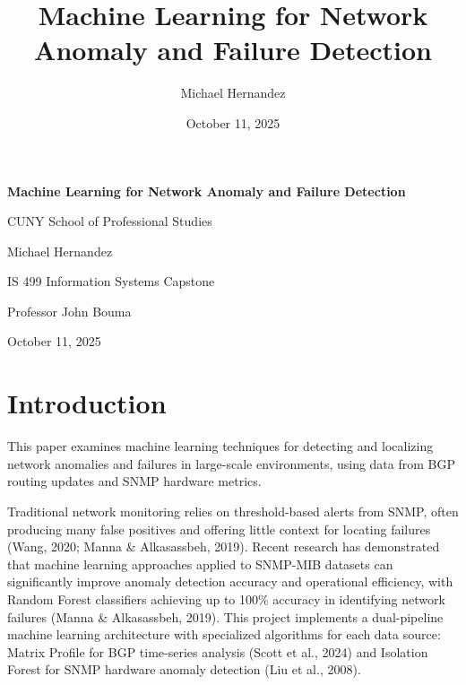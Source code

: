 \documentclass[11pt]{article}
\title{Machine Learning for Network Anomaly and Failure Detection}
\author{Michael Hernandez}
\date{October 11, 2025}
\begin{document}
\begin{titlepage}
\centering
\vspace*{2cm}

{\Large \textbf{Machine Learning for Network Anomaly and Failure Detection}}

\vspace{1.5cm}

{\large CUNY School of Professional Studies}

\vspace{0.5cm}

{\large Michael Hernandez}

\vspace{0.5cm}

{\large IS 499 Information Systems Capstone}

\vspace{0.5cm}

{\large Professor John Bouma}

\vspace{0.5cm}

{\large October 11, 2025}

\vfill

\end{titlepage}

\tableofcontents
\newpage

\section{Introduction}

This paper examines machine learning techniques for detecting and localizing network anomalies and failures in large-scale environments, using data from BGP routing updates and SNMP hardware metrics.

Traditional network monitoring relies on threshold-based alerts from SNMP, often producing many false positives and offering little context for locating failures (Wang, 2020; Manna \& Alkasassbeh, 2019). Recent research has demonstrated that machine learning approaches applied to SNMP-MIB datasets can significantly improve anomaly detection accuracy and operational efficiency, with Random Forest classifiers achieving up to 100\% accuracy in identifying network failures (Manna \& Alkasassbeh, 2019). This project implements a dual-pipeline machine learning architecture with specialized algorithms for each data source: Matrix Profile for BGP time-series analysis (Scott et al., 2024) and Isolation Forest for SNMP hardware anomaly detection (Liu et al., 2008).
\end{document}
